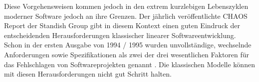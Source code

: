 Diese Vorgehensweisen kommen jedoch in den extrem kurzlebigen Lebenszyklen moderner Software jedoch an ihre Grenzen. Der jährlich veröffentlichte CHAOS Report der Standish Group gibt in diesem Kontext einen guten Eindruck der entscheidenden Herausforderungen klassischer linearer Softwareentwicklung. Schon in der ersten Ausgabe von 1994 / 1995 \cite{noauthor_standish_1995} wurden unvollständige, wechselnde Anforderungen sowie Spezifikationen als zwei der drei wesentlichen Faktoren für das Fehlschlagen von Softwareprojekten genannt  \cite[S. 4]{noauthor_standish_1995}.
Die klassischen Modelle können mit diesen Herausforderungen nicht gut Schritt halten.



